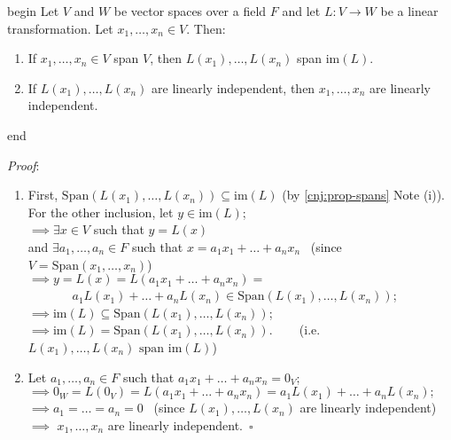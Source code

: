 \documentclass[
  12pt,
  a4paper,
  twoside]{article}
\providecommand{\tightlist}{%
  \setlength{\itemsep}{0pt}\setlength{\parskip}{0pt}}
\theoremstyle{plain}
\theoremstyle{definition}
\begin{document}
\csname begin\label{cnj:prop-LT-span-LI}
Let \(V\) and \(W\) be vector spaces over a field \(F\) and let \(L: V \to W\) be a linear transformation. Let \(x_{1}, \dots, x_{n} \in V\). Then:

\begin{enumerate}
\def\labelenumi{(\roman{enumi})}
\tightlist
\item
  If \(x_{1}, \dots, x_{n} \in V\) span \(V\), then \(L(x_{1}), \dots, L(x_{n})\) span \(\textrm{im}(L)\).
\item
  If \(L(x_{1}), \dots, L(x_{n})\) are linearly independent, then \(x_{1}, \dots, x_{n}\) are linearly independent.
\end{enumerate}

\csname end

\emph{Proof}:

\begin{enumerate}
\def\labelenumi{(\alph{enumi})}
\item
  First, \(\mathrm{Span}(L(x_1),\dots,L(x_n))\subseteq \mathrm{im}(L)\) (by \ref{cnj:prop-spans} Note (i)).\\
  For the other inclusion, let \(y \in \mathrm{im}(L)\);\\
  \(\implies \exists x \in V\) such that \(y = L(x)\)\\
  and \(\exists a_{1}, \dots, a_{n} \in F\) such that \(x = a_{1}x_{1} + \dots + a_{n}x_{n}\) \hfill~{(since \(V= \mathrm{Span}(x_{1}, \dots, x_{n})\))}\\
  \(\implies y = L(x) = L(a_{1}x_{1} + \dots + a_{n}x_{n}) =\)\\
  \(\phantom{adfasdf} a_{1}L(x_{1}) + \dots + a_{n}L(x_{n}) \in \mathrm{Span}(L(x_{1}), \dots, L(x_{n}))\);\\
  \(\implies \mathrm{im}(L)\subseteq \mathrm{Span}(L(x_1),\dots,L(x_n))\);\\
  \(\implies \mathrm{im}(L)=\mathrm{Span}(L(x_1),\dots,L(x_n))\). ~~~ (i.e.~\(L(x_{1}), \dots, L(x_{n}) \text{ span im}(L)\))
\item
  Let \(a_{1} , \dots, a_{n} \in F\) such that \(a_{1}x_{1} + \dots + a_{n}x_{n} = 0_{V}\);\\
  \(\implies 0_{W} = L(0_{V}) = L(a_{1}x_{1} + \dots + a_{n}x_{n}) = a_{1}L(x_{1}) + \dots + a_{n}L(x_{n});\)\\
  \(\implies a_{1} = \dots = a_{n} = 0\) \hfill~{(since \(L(x_{1}), \dots, L(x_{n})\) are linearly independent)}\\
  \(\implies\) \(x_{1} , \dots, x_{n}\) are linearly independent.\hfill~{\(\square\)}
\end{enumerate}
\end{document}
